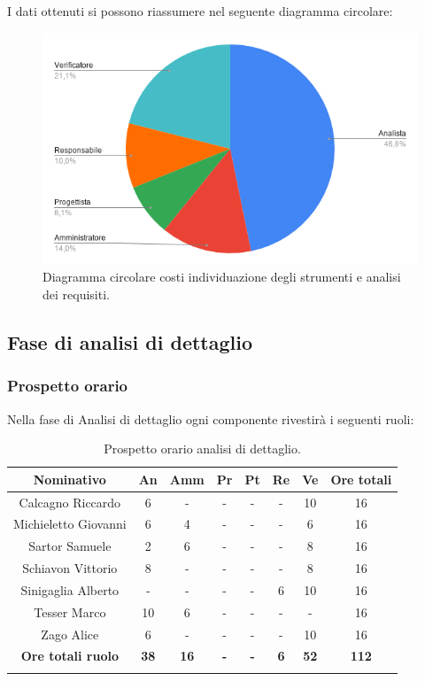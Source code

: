 I dati ottenuti si possono riassumere nel seguente diagramma circolare:
\begin{figure}[H]
	\centering
	\includegraphics[width=0.6\linewidth]{./res/images/CostiStrumentiRequisiti.png}
	\caption{Diagramma circolare costi individuazione degli strumenti e analisi dei requisiti.}
	\label{fig: Diagramma circolare costi individuazione degli strumenti e analisi dei requisiti.}
\end{figure}

		

%
%
%
%
\subsection{Fase di analisi di dettaglio}

\subsubsection{Prospetto orario}

Nella fase di Analisi di dettaglio ogni componente rivestirà i seguenti ruoli:
\begin{longtable}{|c|c|c|c|c|c|c|c|}
	\hline
	\rowcolor[HTML]{F9CB9C} 
	\textbf{Nominativo} & \textbf{An} & \textbf{Amm} & \textbf{Pr} & \textbf{Pt} & \textbf{Re} & \textbf{Ve} & \textbf{Ore totali} \\
	\hline
	Calcagno Riccardo & 
	6 &
	- &
	- &
	- &
	- &
	10 &
	16 \\
	\hline
	Michieletto Giovanni &
	6 &
	4 &
	- &
	- &
	- &
	6 &
	16 \\
	\hline
	Sartor Samuele & 
	2 &
	6 &
	- &
	- &
	- &
	8 &
	16 \\
	\hline
	Schiavon Vittorio & 
	8 &
	- &
	- &
	- &
	- &
	8 &
	16 \\
	\hline
	Sinigaglia Alberto & 
	- &
	- &
	- &
	- &
	6 &
	10 &
	16 \\
	\hline
	Tesser Marco & 
	10 &
	6 &
	- &
	- &
	- &
	- &
	16 \\
	\hline	
	Zago Alice & 
	6 &
	- &
	- &
	- &
	- &
	10 &
	16 \\
	\hline	
	\rowcolor[HTML]{F9CB9C} 
	\textbf{Ore totali ruolo} & \textbf{38} & \textbf{16} & \textbf{-} & \textbf{-} & \textbf{6} & \textbf{52} & \textbf{112} \\
	\hline
	\caption{Prospetto orario analisi di dettaglio.}
	\label{fig: Prospetto orario analisi di dettaglio.}
\end{longtable}

